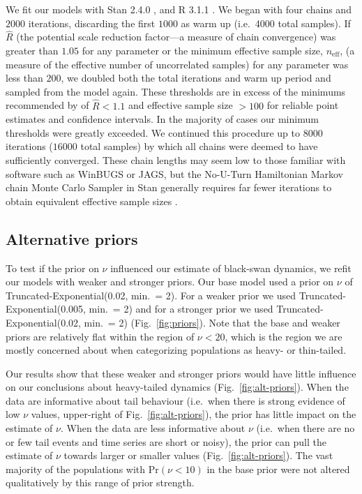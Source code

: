 We fit our models with Stan 2.4.0 \citep{stan-manual2014}, and R 3.1.1
\citep{r2014}. We began with four chains and $2000$ iterations, discarding the
first $1000$ as warm up (i.e.~4000 total samples). If $\hat{R}$ (the potential
scale reduction factor---a measure of chain convergence) was greater than
$1.05$ for any parameter or the minimum effective sample size,
$n_\mathrm{eff}$, (a measure of the effective number of uncorrelated samples)
for any parameter was less than $200$, we doubled both the total iterations
and warm up period and sampled from the model again. These thresholds are in
excess of the minimums recommended by \citet{gelman2006a} of $\hat{R} < 1.1$
and effective sample size $> 100$ for reliable point estimates and confidence
intervals. In the majority of cases our minimum thresholds were greatly
exceeded. We continued this procedure up to $8000$ iterations ($16000$ total
samples) by which all chains were deemed to have sufficiently converged. These
chain lengths may seem low to those familiar with software such as WinBUGS or
JAGS, but the No-U-Turn Hamiltonian Markov chain Monte Carlo Sampler in Stan
generally requires far fewer iterations to obtain equivalent effective sample
sizes \citep{stan-manual2014}.

\subsection{Alternative priors}

To test if the prior on $\nu$ influenced our estimate of black-swan dynamics,
we refit our models with weaker and stronger priors. Our base model used a
prior on $\nu$ of Truncated-Exponential(0.02, min.\ = 2). For a weaker prior
we used Truncated-Exponential(0.005, min.\ = 2) and for a stronger prior we
used Truncated-Exponential(0.02, min.\ = 2) (Fig.~\ref{fig:priors}). Note that
the base and weaker priors are relatively flat within the region of $\nu <
20$, which is the region we are mostly concerned about when categorizing populations
as heavy- or thin-tailed.

Our results show that these weaker and stronger priors would have little
influence on our conclusions about heavy-tailed dynamics
(Fig.~\ref{fig:alt-priors}). When the data are informative about tail
behaviour (i.e.\ when there is strong evidence of low $\nu$ values,
upper-right of Fig.~\ref{fig:alt-priors}), the prior has little impact on the
estimate of $\nu$. When the data are less informative about $\nu$ (i.e.\ when
there are no or few tail events and time series are short or noisy), the prior
can pull the estimate of $\nu$ towards larger or smaller values
(Fig.~\ref{fig:alt-priors}). The vast majority of the populations with Pr$(\nu
< 10)$ in the base prior were not altered qualitatively by this range of prior
strength.

